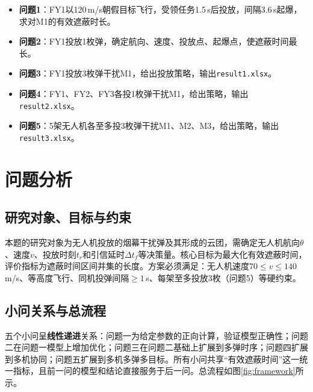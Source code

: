 \documentclass[a4paper]{ctexart}
\begin{document}
\begin{itemize}
  \item \textbf{问题1}：FY1以120\,m/s朝假目标飞行，受领任务1.5\,s后投放，间隔3.6\,s起爆，求对M1的有效遮蔽时长。
  \item \textbf{问题2}：FY1投放1枚弹，确定航向、速度、投放点、起爆点，使遮蔽时间最长。
  \item \textbf{问题3}：FY1投放3枚弹干扰M1，给出投放策略，输出\texttt{result1.xlsx}。
  \item \textbf{问题4}：FY1、FY2、FY3各投1枚弹干扰M1，给出策略，输出\texttt{result2.xlsx}。
  \item \textbf{问题5}：5架无人机各至多投3枚弹干扰M1、M2、M3，给出策略，输出\texttt{result3.xlsx}。
\end{itemize}

\section{问题分析}

\subsection{研究对象、目标与约束}

本题的研究对象为无人机投放的烟幕干扰弹及其形成的云团，需确定无人机航向$\theta$、速度$v$、投放时刻$t_r$和引信延时$\Delta t_f$等决策量。核心目标为最大化有效遮蔽时间，评价指标为遮蔽时间区间并集的长度。方案必须满足：无人机速度$70\leq v\leq 140$\,m/s、等高度飞行、同机投弹间隔$\geq 1$\,s、每架至多投放3枚（问题5）等硬约束。

\subsection{小问关系与总流程}

五个小问呈\textbf{线性递进}关系：问题一为给定参数的正向计算，验证模型正确性；问题二在问题一模型上增加优化；问题三在问题二基础上扩展到多弹时序；问题四扩展到多机协同；问题五扩展到多机多弹多目标。所有小问共享``有效遮蔽时间''这一统一指标，且前一问的模型和结论直接服务于后一问。总流程如图\ref{fig:framework}所示。
\end{document}
